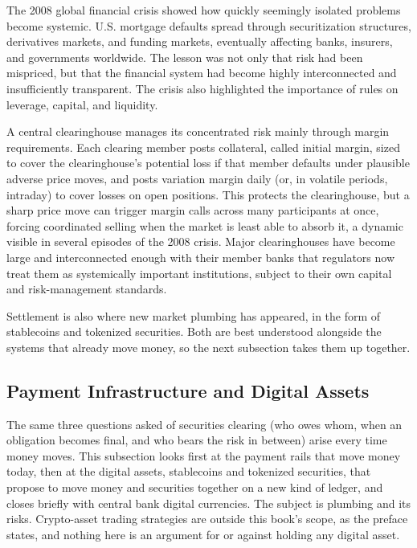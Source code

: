 \documentclass[../ai_in_finance]{subfiles}
\begin{document}
The 2008 global financial crisis showed how quickly seemingly isolated problems become systemic. U.S. mortgage defaults spread through securitization structures, derivatives markets, and funding markets, eventually affecting banks, insurers, and governments worldwide. The lesson was not only that risk had been mispriced, but that the financial system had become highly interconnected and insufficiently transparent. The crisis also highlighted the importance of rules on leverage, capital, and liquidity.

A central clearinghouse manages its concentrated risk mainly through margin requirements. Each clearing member posts collateral, called initial margin, sized to cover the clearinghouse's potential loss if that member defaults under plausible adverse price moves, and posts variation margin daily (or, in volatile periods, intraday) to cover losses on open positions. This protects the clearinghouse, but a sharp price move can trigger margin calls across many participants at once, forcing coordinated selling when the market is least able to absorb it, a dynamic visible in several episodes of the 2008 crisis.
Major clearinghouses have become large and interconnected enough with their member banks that regulators now treat them as systemically important institutions, subject to their own capital and risk-management standards.

Settlement is also where new market plumbing has appeared, in the form of stablecoins and tokenized securities. Both are best understood alongside the systems that already move money, so the next subsection takes them up together.

\subsection{Payment Infrastructure and Digital Assets}
\label{sec:payments-digital}

The same three questions asked of securities clearing (who owes whom, when an obligation becomes final, and who bears the risk in between) arise every time money moves. This subsection looks first at the payment rails that move money today, then at the digital assets, stablecoins and tokenized securities, that propose to move money and securities together on a new kind of ledger, and closes briefly with central bank digital currencies. The subject is plumbing and its risks. Crypto-asset trading strategies are outside this book's scope, as the preface states, and nothing here is an argument for or against holding any digital asset.
\end{document}
